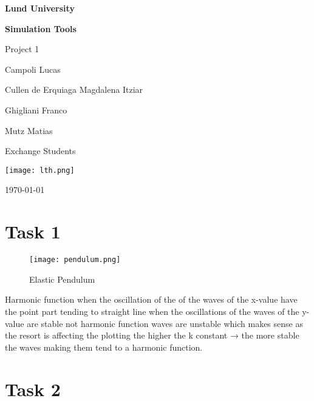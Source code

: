 \documentclass{article}
\begin{document}
\begin{titlepage}
    \centering
    \vspace*{1.5cm}
    {\LARGE\bfseries Lund University\par}
    \vspace*{0.5cm}
    {\LARGE\bfseries Simulation Tools\par}
    \vspace{1cm}
    {\Large Project 1\par}
    \vspace{1cm}
    {\Large Campoli Lucas\par}
    \vspace{0.5cm}
    {\Large Cullen de Erquiaga Magdalena Itziar\par}
    \vspace{0.5cm}
    {\Large Ghigliani Franco\par}
    \vspace{0.5cm}
    {\Large Mutz Matias\par}
    \vspace{1cm}
    {\large Exchange Students\par}
    \vspace{2cm}
    \texttt{[image: lth.png]}
    \vfill
    {\large \today\par}
\end{titlepage}

\tableofcontents
\newpage

\section{Task 1}

\begin{figure}[h!]
    \centering
    \texttt{[image: pendulum.png]}
    \caption{Elastic Pendulum}
    \label{fig:pendulum}
    \cite{pendulum}
\end{figure}

Harmonic function when the oscillation of the of the waves of the x-value have the point part tending to straight line
when the oscillations of the waves of the y-value are stable not harmonic function waves are unstable which makes
sense as the resort is affecting the plotting the higher the k constant → the more stable the waves making them tend
to a harmonic function.

\section{Task 2}
\end{document}
